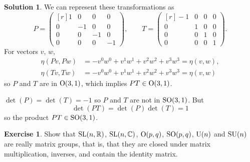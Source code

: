 \documentclass[11pt, a4paper]{report}
\theoremstyle{definition}
\newtheorem{ex}{Exercise}[part]
\newtheorem{sol}{Solution}[part]
\newcommand*{\SL}{\ensuremath\text{SL}}
\renewcommand*{\O}{\ensuremath\text{O}}
\newcommand*{\SO}{\ensuremath\text{SO}}
\newcommand*{\U}{\ensuremath\text{U}}
\newcommand*{\SU}{\ensuremath\text{SU}}
\begin{document}
\begin{sol}

We can represent these transformations as
\[
    P = \begin{pmatrix*}[r]
            1 & 0  & 0  & 0 \\
            0 & -1 & 0  & 0 \\
            0 & 0  & -1 & 0 \\
            0 & 0  & 0  & -1
        \end{pmatrix*}, \qquad
    T = \begin{pmatrix*}[r]
            -1 & 0  & 0  & 0 \\
            0  & 1  & 0  & 0 \\
            0  & 0  & 1  & 0 \\
            0  & 0  & 0  & 1
        \end{pmatrix*}.
\]
For vectors $v$, $w$,
\begin{align*}
    \eta(Pv, Pw) &= -v^0 w^0 + v^1 w^1 + v^2 w^2 + v^3 w^3 = \eta(v, w), \\
    \eta(Tv, Tw) &= -v^0 w^0 + v^1 w^1 + v^2 w^2 + v^3 w^3 = \eta(v, w)
\end{align*}
so $P$ and $T$ are in $\O(3, 1)$, which implies $PT \in \O(3, 1)$.

$\det(P) = \det(T) = -1$ so $P$ and $T$ are not in $\SO(3, 1)$. But
\[
    \det(PT) = \det(P) \det(T) = 1
\]
so the product $PT \in \SO(3, 1)$.

\end{sol}

\begin{ex}

Show that $\SL(n, \mathbb{R})$, $\SL(n, \mathbb{C})$, $\O(p, q)$, $\SO(p, q)$, $\U(n)$ and $\SU(n)$ are really matrix groups,
that is, that they are closed under matrix multiplication, inverses, and contain the identity matrix.

\end{ex}
\end{document}
